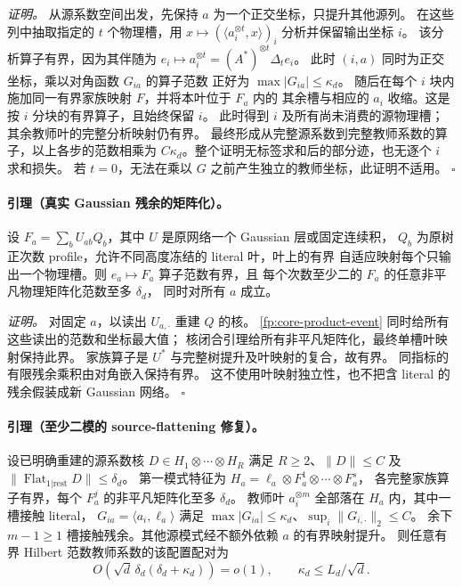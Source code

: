 \documentclass[a4paper]{tufte-handout}
\begin{document}
\begin{fullwidth}
\emph{证明。}
从源系数空间出发，先保持 $a$ 为一个正交坐标，只提升其他源列。
在这些列中抽取指定的 $t$ 个物理槽，用
$x\mapsto(\langle a_i^{\otimes t},x\rangle)_i$ 分析并保留输出坐标 $i$。
该分析算子有界，因为其伴随为
$e_i\mapsto a_i^{\otimes t}=(A^*)^{\otimes t}\Delta_te_i$。
此时 $(i,a)$ 同时为正交坐标，乘以对角函数 $G_{ia}$ 的算子范数
正好为 $\max|G_{ia}|\leq\kappa_d$。
随后在每个 $i$ 块内施加同一有界家族映射 $F$，并将本叶位于 $F_a$ 内的
其余槽与相应的 $a_i$ 收缩。这是按 $i$ 分块的有界算子，且始终保留 $i$。
此时得到 $i$ 及所有尚未消费的源物理槽；其余教师叶的完整分析映射仍有界。
最终形成从完整源系数到完整教师系数的算子，以上各步的范数相乘为
$C\kappa_d$。整个证明无标签求和后的部分迹，也无逐个 $i$ 求和损失。
若 $t=0$，无法在乘以 $G$ 之前产生独立的教师坐标，此证明不适用。
\hfill$\square$

\paragraph{引理（真实 Gaussian 残余的矩阵化）。}
\label{fp:core-residual-flat}
设 $F_a=\sum_bU_{ab}Q_b$，其中 $U$ 是原网络一个 Gaussian 层或固定连续积，
$Q_b$ 为原树正次数 profile，允许不同高度冻结的 literal 叶，叶上的有界
自适应映射每个只输出一个物理槽。则 $e_a\mapsto F_a$ 算子范数有界，且
每个次数至少二的 $F_a$ 的任意非平凡物理矩阵化范数至多 $\delta_d$，
同时对所有 $a$ 成立。

\emph{证明。}
对固定 $a$，以读出 $U_{a,\cdot}$ 重建 $Q$ 的核。
\eqref{fp:core-product-event} 同时给所有这些读出的范数和坐标最大值；
核闭合引理给所有非平凡矩阵化，最终单槽叶映射保持此界。
家族算子是 $U^*$ 与完整树提升及叶映射的复合，故有界。
同指标的有限残余乘积由对角嵌入保持有界。
这不使用叶映射独立性，也不把含 literal 的残余假装成新 Gaussian 网络。
\hfill$\square$

\paragraph{引理（至少二模的 source-flattening 修复）。}
\label{fp:core-hybrid-Rge2}
设已明确重建的源系数核 $D\in H_1\otimes\cdots\otimes H_R$ 满足
$R\geq2$、$\|D\|\leq C$ 及
$\|\operatorname{Flat}_{1|\mathrm{rest}}D\|\leq\delta_d$。
第一模式特征为
$H_a=\ell_a\otimes F_a^1\otimes\cdots\otimes F_a^s$，
各完整家族算子有界，每个 $F_a^j$ 的非平凡矩阵化至多 $\delta_d$。
教师叶 $a_i^{\otimes m}$ 全部落在 $H_a$ 内，其中一槽接触 literal，
$G_{ia}=\langle a_i,\ell_a\rangle$ 满足
$\max|G_{ia}|\leq\kappa_d$、$\sup_i\|G_{i,\cdot}\|_2\leq C$。
余下 $m-1\geq1$ 槽接触残余。其他源模式经不额外依赖 $a$ 的有界映射提升。
则任意有界 Hilbert 范数教师系数的该配置配对为
\begin{equation}
 O\!\left(\sqrt d\,\delta_d(\delta_d+\kappa_d)\right)=o(1),
 \qquad \kappa_d\leq L_d/\sqrt d.
 \label{fp:core-hybrid-bound}
\end{equation}


\end{fullwidth}
\end{document}
